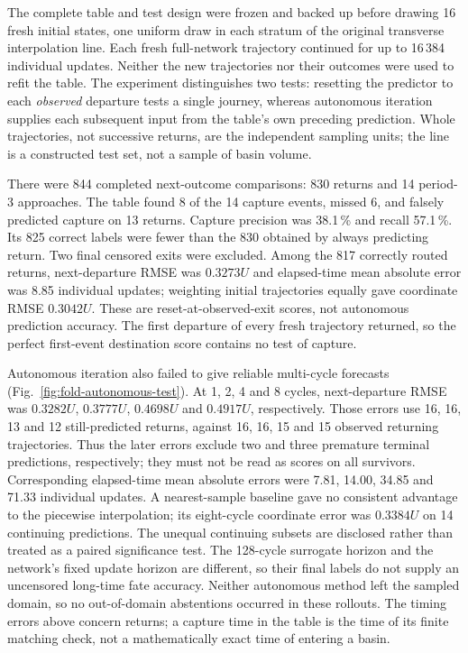 \documentclass[11pt,letterpaper]{article}
\begin{document}
The complete table and test design were frozen and backed up before drawing 16 fresh initial states,
one uniform draw in each stratum of the original transverse interpolation line. Each fresh full-network
trajectory continued for up to 16\,384 individual updates. Neither the new trajectories nor their outcomes
were used to refit the table. The experiment distinguishes two tests: resetting the predictor to each
\emph{observed} departure tests a single journey, whereas autonomous iteration supplies each subsequent input
from the table's own preceding prediction. Whole trajectories, not successive returns, are the independent
sampling units; the line is a constructed test set, not a sample of basin volume.

There were 844 completed next-outcome comparisons: 830 returns and 14 period-3 approaches. The table found
8 of the 14 capture events, missed 6, and falsely predicted capture on 13 returns. Capture precision was
38.1\,\% and recall 57.1\,\%. Its 825 correct labels were fewer than the 830 obtained by always predicting
return. Two final censored exits were excluded. Among the 817 correctly routed returns, next-departure RMSE
was $0.3273U$ and elapsed-time mean absolute error was 8.85 individual updates; weighting initial trajectories
equally gave coordinate RMSE $0.3042U$. These are reset-at-observed-exit scores, not autonomous prediction
accuracy. The first departure of every fresh trajectory returned, so the perfect first-event destination
score contains no test of capture.

Autonomous iteration also failed to give reliable multi-cycle forecasts (Fig.~\ref{fig:fold-autonomous-test}).
At 1, 2, 4 and 8 cycles, next-departure RMSE was $0.3282U$, $0.3777U$, $0.4698U$ and $0.4917U$,
respectively. Those errors use 16, 16, 13 and 12 still-predicted returns, against 16, 16, 15 and 15 observed
returning trajectories. Thus the later errors exclude two and three premature terminal predictions,
respectively; they must not be read as scores on all survivors. Corresponding elapsed-time mean absolute
errors were 7.81, 14.00, 34.85 and 71.33 individual updates. A nearest-sample baseline gave no consistent
advantage to the piecewise interpolation; its eight-cycle coordinate error was $0.3384U$ on 14 continuing
predictions. The unequal continuing subsets are disclosed rather than treated as a paired significance test.
The 128-cycle surrogate horizon and the network's fixed update horizon are different, so their final labels
do not supply an uncensored long-time fate accuracy. Neither autonomous method left the sampled domain, so
no out-of-domain abstentions occurred in these rollouts. The timing errors above concern returns; a capture
time in the table is the time of its finite matching check, not a mathematically exact time of entering a basin.
\end{document}
